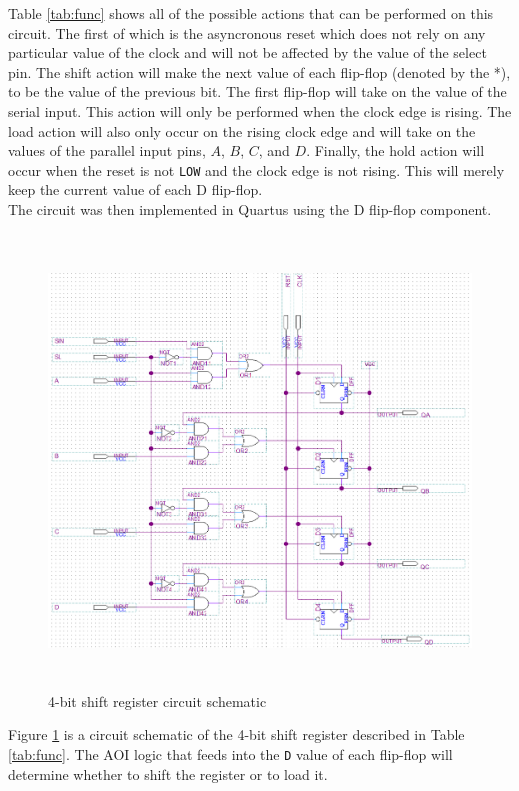 \documentclass[CMPE]{KGCOEReport}
\begin{document}
Table \ref{tab:func} shows all of the possible actions that can be performed on this circuit. The first of which is the asyncronous reset which does not rely on any particular value of the clock and will not be affected by the value of the select pin. The shift action will make the next value of each flip-flop (denoted by the *), to be the value of the previous bit. The first flip-flop will take on the value of the serial input. This action will only be performed when the clock edge is rising. The load action will also only occur on the rising clock edge and will take on the values of the parallel input pins, $A$, $B$, $C$, and $D$. Finally, the hold action will occur when the reset is not \texttt{LOW} and the clock edge is not rising. This will merely keep the current value of each D flip-flop.\\


The circuit was then implemented in Quartus using the D flip-flop component.

\pagebreak

\begin{figure}[h!]
	\centering
	\includegraphics[height=12cm]{schematic1}
	\caption{4-bit shift register circuit schematic}
	\label{fig:shift-schem-aoi}
\end{figure}

Figure \ref{fig:shift-schem-aoi} is a circuit schematic of the 4-bit shift register described in Table \ref{tab:func}. The AOI logic that feeds into the \texttt{D} value of each flip-flop will determine whether to shift the register or to load it.\\
\end{document}
